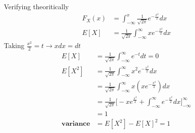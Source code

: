 \documentclass[journal,12pt,twocolumn]{IEEEtran}
\renewcommand\thesection{\arabic{section}}
\begin{document}
\begin{enumerate}[label=\thesection.\arabic*
,ref=\thesection.\theenumi]
\solution Verifying theoritically
    \begin{align}
        F_X(x) &= \int_{-\infty}^{x}\frac{1}{\sqrt{2\pi}}e^{-\frac{x^2}{2}}dx \\
        E[X]&= \frac{1}{\sqrt{2\pi}} \int_{-\infty}^{\infty}xe^{-\frac{x^2}{2}}dx 
    \end{align}
    Taking $\frac{x^2}{2} = t \rightarrow xdx = dt$
    \begin{align}
        E[X]&= \frac{1}{\sqrt{2\pi}} \int_{-\infty}^{\infty}e^{-t} dt = 0 \\
        E[X^2]&= \frac{1}{\sqrt{2\pi}} \int_{-\infty}^{\infty}x^2e^{-\frac{x^2}{2}}dx \\
        &= \frac{1}{\sqrt{2\pi}} \int_{-\infty}^{\infty}x(xe^{-\frac{x^2}{2}})dx \\
        &= \frac{1}{\sqrt{2\pi}} \bigg[-xe^{\frac{x^2}{2}}+\int_{-\infty}^{\infty}e^{-\frac{x^2}{2}} dx \bigg]_{-\infty}^{\infty} \\
        &= 1 \\
        \textbf{variance} &= E[X^2] - E[X]^2 = 1
    \end{align}
\end{enumerate}
\end{document}
